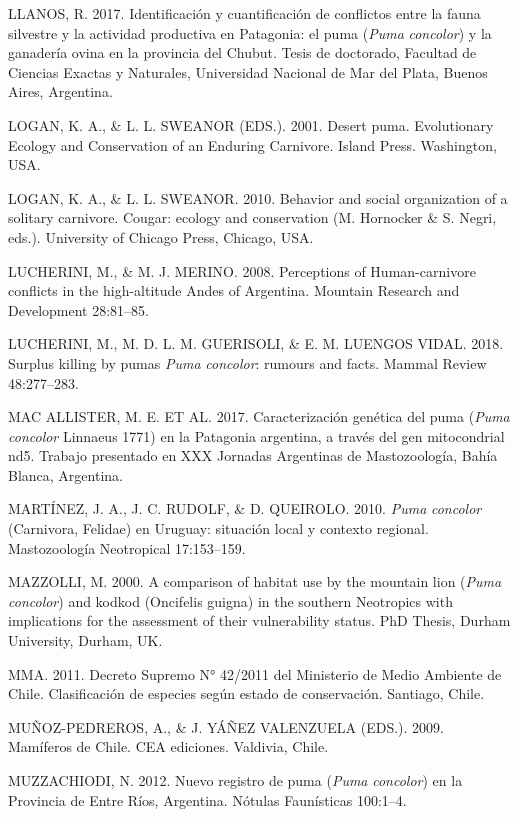\documentclass[
  x11names]{article}
\begin{document}
LLANOS, R. 2017. Identificación y cuantificación de conflictos entre la
fauna silvestre y la actividad productiva en Patagonia: el puma
(\textit{Puma} \textit{concolor}) y la ganadería ovina en la provincia
del Chubut. Tesis de doctorado, Facultad de Ciencias Exactas y
Naturales, Universidad Nacional de Mar del Plata, Buenos Aires,
Argentina.

LOGAN, K. A., \& L. L. SWEANOR (EDS.). 2001. Desert puma. Evolutionary
Ecology and Conservation of an Enduring Carnivore. Island Press.
Washington, USA.

LOGAN, K. A., \& L. L. SWEANOR. 2010. Behavior and social organization
of a solitary carnivore. Cougar: ecology and conservation (M. Hornocker
\& S. Negri, eds.). University of Chicago Press, Chicago, USA.

LUCHERINI, M., \& M. J. MERINO. 2008. Perceptions of Human-carnivore
conflicts in the high-altitude Andes of Argentina. Mountain Research and
Development 28:81--85.

LUCHERINI, M., M. D. L. M. GUERISOLI, \& E. M. LUENGOS VIDAL. 2018.
Surplus killing by pumas \textit{Puma} \textit{concolor}: rumours and
facts. Mammal Review 48:277--283.

MAC ALLISTER, M. E. ET AL. 2017. Caracterización genética del puma
(\textit{Puma} \textit{concolor} Linnaeus 1771) en la Patagonia
argentina, a través del gen mitocondrial nd5. Trabajo presentado en XXX
Jornadas Argentinas de Mastozoología, Bahía Blanca, Argentina.

MARTÍNEZ, J. A., J. C. RUDOLF, \& D. QUEIROLO. 2010. \textit{Puma}
\textit{concolor} (Carnivora, Felidae) en Uruguay: situación local y
contexto regional. Mastozoología Neotropical 17:153--159.

MAZZOLLI, M. 2000. A comparison of habitat use by the mountain lion
(\textit{Puma} \textit{concolor}) and kodkod (Oncifelis guigna) in the
southern Neotropics with implications for the assessment of their
vulnerability status. PhD Thesis, Durham University, Durham, UK.

MMA. 2011. Decreto Supremo N° 42/2011 del Ministerio de Medio Ambiente
de Chile. Clasificación de especies según estado de conservación.
Santiago, Chile.

MUÑOZ-PEDREROS, A., \& J. YÁÑEZ VALENZUELA (EDS.). 2009. Mamíferos de
Chile. CEA ediciones. Valdivia, Chile.

MUZZACHIODI, N. 2012. Nuevo registro de puma (\textit{Puma}
\textit{concolor}) en la Provincia de Entre Ríos, Argentina. Nótulas
Faunísticas 100:1--4.
\end{document}
